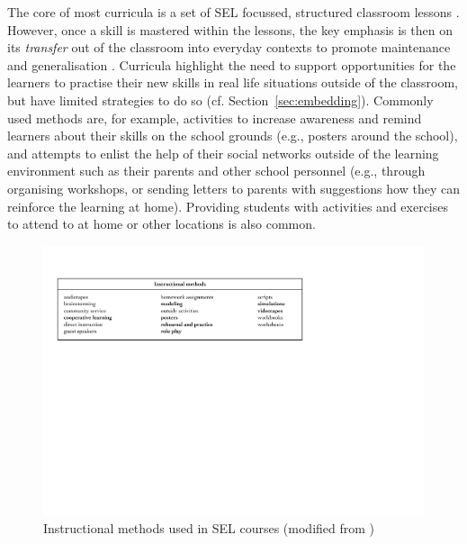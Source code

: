\documentclass[prodmode,acmtochi]{acmsmall}
\newcommand{\todo}[1]{\textrm{\textrm{\textcolor{LightBlue}{[[#1]]}}}}
\newcommand{\todolater}[1]{}
\begin{document}
The core of most curricula is a set of SEL focussed, structured classroom lessons \cite{jones2012social}. However, once a skill is mastered within the lessons, the key emphasis is then on its \emph{transfer} out of the classroom into everyday contexts to promote maintenance and generalisation \cite{Elias1997,Maree2007,Pasi2001}. Curricula highlight the need to support opportunities for the learners to practise their new skills in real life situations outside of the classroom, but have limited strategies to do so (cf. Section~\ref{sec:embedding}). Commonly used methods are, for example, activities to increase awareness and remind learners about their skills on the school grounds (e.g., posters around the school), and attempts to enlist the help of their social networks outside of the learning environment such as their parents and other school personnel (e.g., through organising workshops, or sending letters to parents with suggestions how they can reinforce the learning at home). Providing students with activities and exercises to attend to at home or other locations is also common.
\todolater{Add example from SecondStep pointing to use of videorecordings and workshops for parents ==> highly useful... See \cite[p.88]{Elias1997}.}



\begin{figure}
  \centering
	\includegraphics[width=.98\textwidth]{images/Elias-MethodsList}
	\caption{Instructional methods used in SEL courses (modified from \cite[p.109]{Elias1997})}
	\label{fig:methods}
\end{figure}
\end{document}
